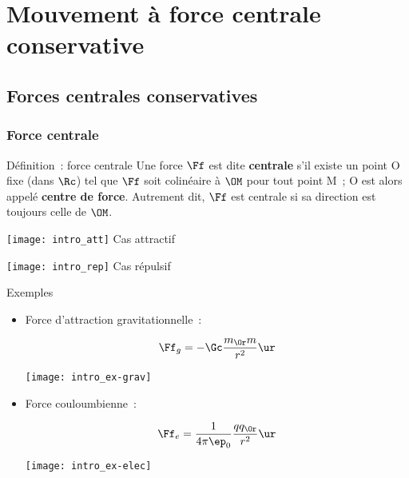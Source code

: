 \documentclass[../main/main.tex]{subfiles}
\begin{document}
\setcounter{chapter}{6}

\chapter{Mouvement \`a force centrale conservative}

\section{Forces centrales conservatives}
\subsection{Force centrale}
\begin{tdefi}{Définition~: force centrale}
    Une force $\Ff$ est dite \textbf{centrale} s'il existe un point O fixe (dans
    $\Rc$) tel que $\Ff$ soit colinéaire à $\OM$ pour tout point M~; O est alors
    appelé \textbf{centre de force}. Autrement dit, $\Ff$ est centrale si sa
    direction est toujours celle de $\OM$. \smallbreak
    \begin{side}
        \begin{center}
            \texttt{[image: intro\_att]}
            Cas attractif
        \end{center}
        \tcblower
        \begin{center}
            \texttt{[image: intro\_rep]}
            Cas répulsif
        \end{center}
    \end{side}
\end{tdefi}
\begin{rexem}{Exemples}
    \begin{itemize}
        \item Force d'attraction gravitationnelle~: \smallbreak
            \begin{minipage}{0.45\linewidth}
                \[\Ff_g = -\Gc \frac{m_\Or m}{r^2}\ur\]
            \end{minipage}
            \hfill
            \begin{minipage}{0.45\linewidth}
                \begin{center}
                    \texttt{[image: intro\_ex-grav]}
                \end{center}
            \end{minipage}
        \item Force couloumbienne~: \smallbreak
            \begin{minipage}{0.45\linewidth}
                \[\Ff_e = \frac{1}{4\pi\ep_0} \frac{qq_\Or}{r^2}\ur\]
            \end{minipage}
            \hfill
            \begin{minipage}{0.45\linewidth}
                \texttt{[image: intro\_ex-elec]}
            \end{minipage}
    \end{itemize}
\end{rexem}
\end{document}
